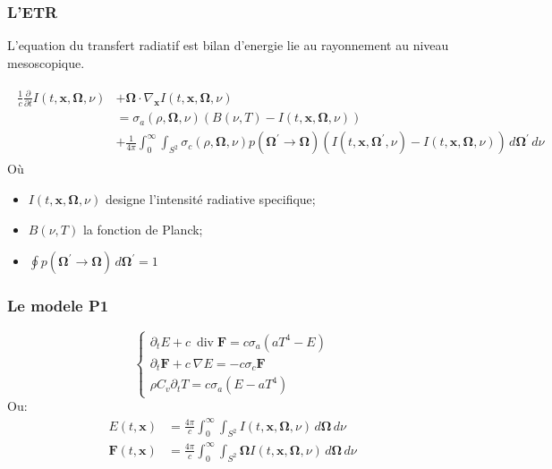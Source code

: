 \documentclass[xcolor=dvipsnames]{beamer} %
\newcommand{\bvec}[1]{\mathbf{#1}}
\begin{document}
\begin{frame}
  \frametitle{L'ETR}
  L'equation du transfert radiatif est bilan d'energie lie au rayonnement au niveau mesoscopique. 

  \begingroup
  \scriptsize
  \begin{gather*}
      \begin{aligned}
      \frac{1}{c} \frac{\partial}{\partial t}I(t,\bvec{x},\bm{\Omega},\nu) &+\bm{\Omega}\cdot\nabla_{\bvec{x}} I(t,\bvec{x},\bm{\Omega},\nu) \\
      &= \sigma_a(\rho,\bm{\Omega},\nu)\left(B(\nu,T)-I(t,\bvec{x},\bm{\Omega},\nu)\right) \\
      &+ \frac{1}{4\pi} \int_{0}^{\infty} \int_{S^2}\sigma_c(\rho,\bm{\Omega},\nu)p(\bm{\Omega}^\prime\rightarrow\bm{\Omega})\left(I(t,\bvec{x},\bm{\Omega}^\prime,\nu)-I(t,\bvec{x},\bm{\Omega},\nu)\right) \, d\bm{\Omega}^\prime \, d\nu
      \end{aligned}
  \end{gather*}
  \endgroup
Où 
\begin{itemize}
  \item $I(t,\bvec{x},\bm{\Omega},\nu)$ designe l'intensité radiative specifique;
  \item $B(\nu,T)$ la fonction de Planck;
  \item $\oint p(\bm{\Omega}^\prime\rightarrow\bm{\Omega})\, d\bm{\Omega}^\prime=1$
\end{itemize}

\end{frame}

\begin{frame}
  \frametitle{Le modele P1}
  \begingroup
  \large
  \begin{equation*}
      \begin{cases}
       \partial_tE + c \ \operatorname {div} \bvec F = c\sigma_a\left(aT^4-E\right)\\
       \partial_t\bvec{F} + c \ \nabla E = -c\sigma_c \bvec{F} \\
       \rho C_v \partial_t T = c \sigma_a \left(E-aT^4\right)
      \end{cases}
  \end{equation*}
  \endgroup
Ou:   %
\begin{align*}
  E(t,\bvec{x}) &= \frac{4\pi}{c} \int_{0}^{\infty} \int_{S^2} I(t,\bvec{x},\bm{\Omega},\nu) \, d\bm{\Omega} \, d\nu \\
  \bvec{F}(t,\bvec{x}) &= \frac{4\pi}{c} \int_{0}^{\infty} \int_{S^2} \bm{\Omega}I(t,\bvec{x},\bm{\Omega},\nu) \, d\bm{\Omega} \, d\nu 
\end{align*}

\end{frame}
\end{document}
